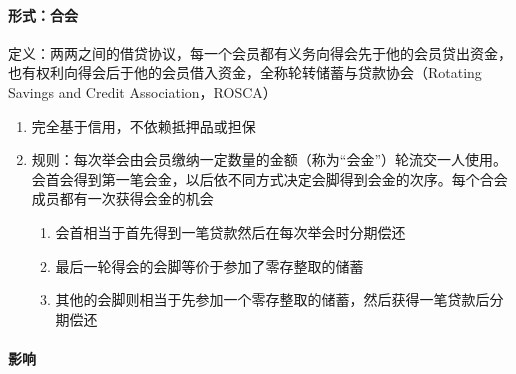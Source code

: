 \documentclass[12pt]{book}
\begin{document}
\paragraph{形式：合会}

定义：两两之间的借贷协议，每一个会员都有义务向得会先于他的会员贷出资金，也有权利向得会后于他的会员借入资金，全称轮转储蓄与贷款协会（Rotating Savings and Credit Association，ROSCA）  
\begin{enumerate}[1.]
    \item 完全基于信用，不依赖抵押品或担保  
    \item 规则：每次举会由会员缴纳一定数量的金额（称为“会金”）轮流交一人使用。会首会得到第一笔会金，以后依不同方式决定会脚得到会金的次序。每个合会成员都有一次获得会金的机会  
    \begin{enumerate}[(1)]
        \item 会首相当于首先得到一笔贷款然后在每次举会时分期偿还  
        \item 最后一轮得会的会脚等价于参加了零存整取的储蓄  
        \item 其他的会脚则相当于先参加一个零存整取的储蓄，然后获得一笔贷款后分期偿还
    \end{enumerate}
\end{enumerate}


\paragraph{影响}
\end{document}
